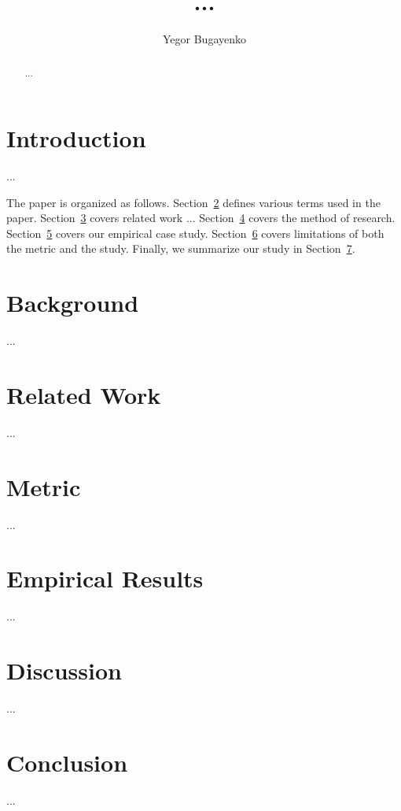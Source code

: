 \documentclass[anonymous,sigconf,10pt,nonacm=true]{acmart}
\title{...}
\author{Yegor Bugayenko}{}{}
\affiliation{%
  \institution{Huawei Technologies Co., Ltd.}
  \city{Moscow, Russia}
}
\begin{document}
\begin{abstract}
...
\end{abstract}
\maketitle

\section{Introduction}

...

The paper is organized as follows.
Section~\ref{sec:background} defines various terms used in the paper.
Section~\ref{sec:related} covers related work ...
Section~\ref{sec:method} covers the method of research.
Section~\ref{sec:results} covers our empirical case study.
Section~\ref{sec:discussion} covers limitations of both the metric and the study.
Finally, we summarize our study in Section~\ref{sec:conclusion}.

\section{Background}
\label{sec:background}

...

\section{Related Work}
\label{sec:related}

...

\section{Metric}
\label{sec:method}

...

\section{Empirical Results}
\label{sec:results}

...

\section{Discussion}
\label{sec:discussion}

...

\section{Conclusion}
\label{sec:conclusion}

...



\end{document}
